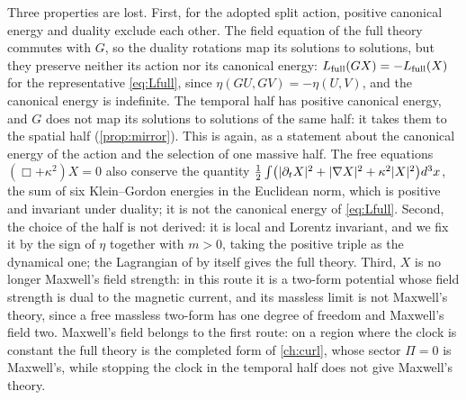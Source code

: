Three properties are lost. First, for the adopted split action, positive canonical energy and duality exclude each other. The field
equation of the full theory commutes with $G$, so the duality rotations map its solutions to solutions, but they preserve neither its
action nor its canonical energy: $L_{\rm full}(GX)=-L_{\rm full}(X)$ for the representative \cref{eq:Lfull}, since
$\eta(GU,GV)=-\eta(U,V)$, and the canonical energy is indefinite. The temporal half has positive canonical energy, and $G$ does not map its
solutions to solutions of the same half: it takes them to the spatial half (\cref{prop:mirror}). This is  again, as a
statement about the canonical energy of the action and the selection of one massive half. The free equations $(\Box+\kappa^2)X=0$ also
conserve the quantity $\tfrac12\int\bigl(|\partial_tX|^2+|\nabla X|^2+\kappa^2|X|^2\bigr)d^3x$, the sum of six Klein--Gordon energies in the
Euclidean norm, which is positive and invariant under duality; it is not the canonical energy of \cref{eq:Lfull}.
Second, the choice of the half is not derived: it is local and Lorentz invariant, and we fix it by the sign of $\eta$ together with $m>0$,
taking the positive triple as the dynamical one; the Lagrangian of  by itself gives the full theory. Third, $X$ is no longer
Maxwell's field strength: in this route it is a two-form potential whose field strength is dual to the magnetic current, and its massless
limit is not Maxwell's theory, since a free massless two-form has one degree of freedom and Maxwell's field two. Maxwell's field belongs to
the first route: on a region where the clock is constant the full theory is the completed form of \cref{ch:curl}, whose sector $\Pi=0$ is
Maxwell's, while stopping the clock in the temporal half does not give Maxwell's theory.
